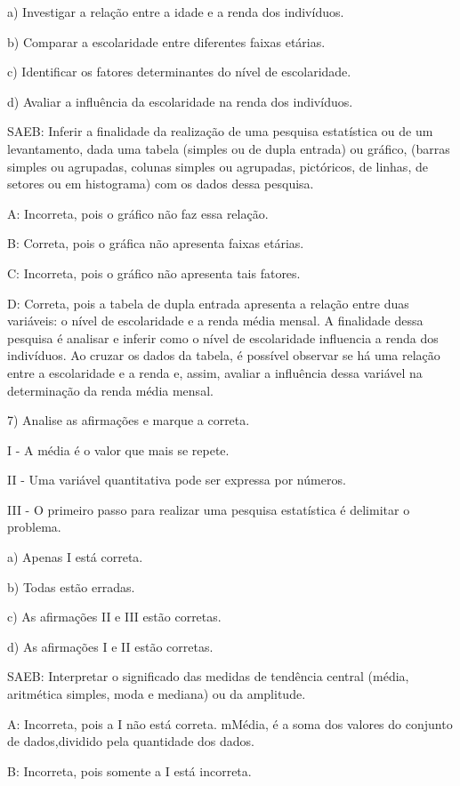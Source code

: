 a) Investigar a relação entre a idade e a renda dos indivíduos.

b) Comparar a escolaridade entre diferentes faixas etárias.

c) Identificar os fatores determinantes do nível de escolaridade.

d) Avaliar a influência da escolaridade na renda dos indivíduos.

SAEB: Inferir a finalidade da realização de uma pesquisa estatística ou
de um levantamento, dada uma tabela (simples ou de dupla entrada) ou
gráfico, (barras simples ou agrupadas, colunas simples ou agrupadas,
pictóricos, de linhas, de setores ou em histograma) com os dados dessa
pesquisa.

A: Incorreta, pois o gráfico não faz essa relação.

B: Correta, pois o gráfica não apresenta faixas etárias.

C: Incorreta, pois o gráfico não apresenta tais fatores.

D: Correta, pois a tabela de dupla entrada apresenta a relação entre
duas variáveis: o nível de escolaridade e a renda média mensal. A
finalidade dessa pesquisa é analisar e inferir como o nível de
escolaridade influencia a renda dos indivíduos. Ao cruzar os dados da
tabela, é possível observar se há uma relação entre a escolaridade e a
renda e, assim, avaliar a influência dessa variável na determinação da
renda média mensal.

7) Analise as afirmações e marque a correta.

I - A média é o valor que mais se repete.

II - Uma variável quantitativa pode ser expressa por números.

III - O primeiro passo para realizar uma pesquisa estatística é
delimitar o problema.

a) Apenas I está correta.

b) Todas estão erradas.

c) As afirmações II e III estão corretas.

d) As afirmações I e II estão corretas.

SAEB: Interpretar o significado das medidas de tendência central (média,
aritmética simples, moda e mediana) ou da amplitude.

A: Incorreta, pois a I não está correta. mMédia, é a soma dos valores do
conjunto de dados,dividido pela quantidade dos dados.

B: Incorreta, pois somente a I está incorreta.

